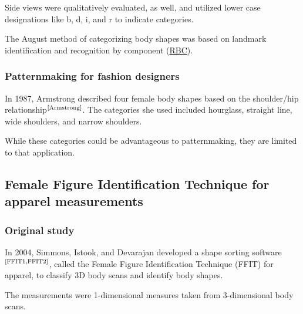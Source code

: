 \documentclass[12pt,a4paper,openany,UKenglish]{scrreprt}
\newcommand{\bib}[1]{$^\text{\cite{#1}}$}
\begin{document}
Side views were qualitatively evaluated, as well, and utilized lower case designations like b, d, i, and r to indicate categories.

The August method of categorizing body shapes was based on landmark identification and recognition by component (\href{https://en.wikipedia.org/wiki/Recognition-by-components_theory}{RBC}).

\subsubsection{Patternmaking for fashion designers}
In 1987, Armstrong described four female body shapes based on the shoulder/hip relationship\bib{Armstrong}.
The categories she used included hourglass, straight line, wide shoulders, and narrow shoulders.

While these categories could be advantageous to patternmaking, they are limited to that application.

\subsection{Female Figure Identification Technique for apparel measurements}
\subsubsection{Original study}

In 2004, Simmons, Istook, and Devarajan developed a shape sorting software\bib{FFIT1,FFIT2}, called the Female Figure Identification Technique (FFIT) for apparel, to classify 3D body scans and identify body shapes.

The measurements were 1-dimensional measures taken from 3-dimensional body scans.
\end{document}
